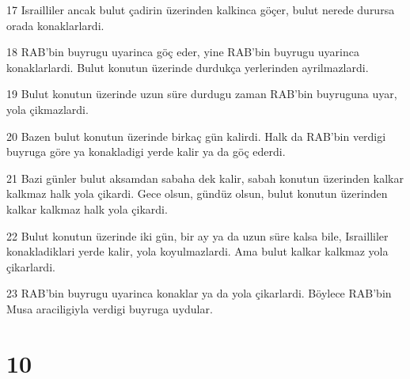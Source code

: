 \par 17 Israilliler ancak bulut çadirin üzerinden kalkinca göçer, bulut nerede durursa orada konaklarlardi.
\par 18 RAB'bin buyrugu uyarinca göç eder, yine RAB'bin buyrugu uyarinca konaklarlardi. Bulut konutun üzerinde durdukça yerlerinden ayrilmazlardi.
\par 19 Bulut konutun üzerinde uzun süre durdugu zaman RAB'bin buyruguna uyar, yola çikmazlardi.
\par 20 Bazen bulut konutun üzerinde birkaç gün kalirdi. Halk da RAB'bin verdigi buyruga göre ya konakladigi yerde kalir ya da göç ederdi.
\par 21 Bazi günler bulut aksamdan sabaha dek kalir, sabah konutun üzerinden kalkar kalkmaz halk yola çikardi. Gece olsun, gündüz olsun, bulut konutun üzerinden kalkar kalkmaz halk yola çikardi.
\par 22 Bulut konutun üzerinde iki gün, bir ay ya da uzun süre kalsa bile, Israilliler konakladiklari yerde kalir, yola koyulmazlardi. Ama bulut kalkar kalkmaz yola çikarlardi.
\par 23 RAB'bin buyrugu uyarinca konaklar ya da yola çikarlardi. Böylece RAB'bin Musa araciligiyla verdigi buyruga uydular.

\chapter{10}

